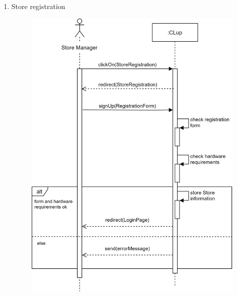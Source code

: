 \documentclass[]{article}
\begin{document}
\begin{enumerate}
						\item Store registration
						\bigskip\bigskip\bigskip
						\begin{figure}[H]
							\centering
							\includegraphics[scale=1.1]{signUpstore.png}
							\caption{}
							\label{fig:storeRegistration_sequencediagramm}
						\end{figure}
						\newpage
						

\end{enumerate}
\end{document}
